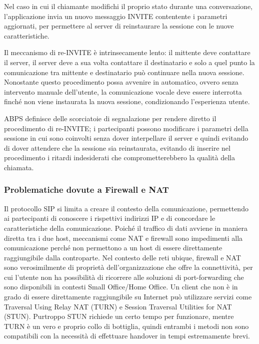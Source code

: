 \documentclass[12pt,a4paper,openright,twoside]{book}
\begin{document}
Nel caso in cui il chiamante modifichi il proprio stato durante una
conversazione, l'applicazione invia un nuovo messaggio INVITE
contentente i parametri aggiornati, per permettere al server di
reinstaurare la sessione con le nuove caratteristiche.

Il meccanismo di re-INVITE è intrinsecamente lento: il mittente deve
contattare il server, il server deve a sua volta contattare il
destinatario e solo a quel punto la comunicazione tra mittente e
destinatario può continuare nella nuova sessione. Nonostante questo
procedimento possa avvenire in automatico, ovvero senza intervento
manuale dell'utente, la comunicazione vocale deve essere interrotta
finché non viene instaurata la nuova sessione, condizionando
l'esperienza utente.

ABPS definisce delle scorciatoie di segnalazione per rendere diretto
il procedimento di re-INVITE; i partecipanti possono modificare i
parametri della sessione in cui sono coinvolti senza dover
interpellare il server e quindi evitando di dover attendere che la
sessione sia reinstaurata, evitando di inserire nel procedimento i
ritardi indesiderati che comprometterebbero la qualità della chiamata.

\subsubsection{Problematiche dovute a Firewall e NAT}

Il protocollo SIP si limita a creare il contesto della comunicazione,
permettendo ai partecipanti di conoscere i rispettivi indirizzi IP e
di concordare le caratteristiche della comunicazione. Poiché il
traffico di dati avviene in maniera diretta tra i due host, meccanismi
come NAT e firewall sono impedimenti alla comunicazione perché non
permettono a un host di essere direttamente raggiungibile dalla
controparte. Nel contesto delle reti ubique, firewall e NAT sono
verosimilmente di proprietà dell'organizzazione che offre la
connettività, per cui l'utente non ha possibilità di ricorrere alle
soluzioni di port-forwarding che sono disponibili in contesti Small
Office/Home Office. Un client che non è in grado di essere
direttamente raggiungibile su Internet può utilizzare servizi come
Traversal Using Relay NAT (TURN) e Session Traversal Utilities for NAT
(STUN). Purtroppo STUN richiede un certo tempo per funzionare, mentre
TURN è un vero e proprio collo di bottiglia, quindi entrambi i metodi
non sono compatibili con la necessità di effettuare handover in tempi
estremamente brevi.
\end{document}
